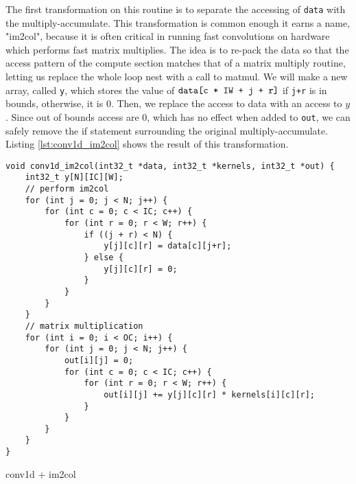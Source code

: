 \documentclass[acmsmall, nonacm=true]{acmart}
\begin{document}
The first transformation on this routine is to separate the accessing of \verb|data| with the multiply-accumulate. This transformation is common enough it earns a name, "im2col", because it is often critical in running fast convolutions on hardware which performs fast matrix multiplies. The idea is to re-pack the data so that the access pattern of the compute section matches that of a matrix multiply routine, letting us replace the whole loop nest with a call to matmul. We will make a new array, called \verb|y|, which stores the value of $\verb|data[c * IW + j + r]|$ if \verb|j+r| is in bounds, otherwise, it is 0. Then, we replace the access to data with an access to $y$. Since out of bounds access are $0$, which has no effect when added to \verb|out|, we can safely remove the if statement surrounding the original multiply-accumulate. Listing \ref{lst:conv1d_im2col} shows the result of this transformation.

\begin{listing}
    \centering
    \begin{verbatim}
void conv1d_im2col(int32_t *data, int32_t *kernels, int32_t *out) {
    int32_t y[N][IC][W];
    // perform im2col
    for (int j = 0; j < N; j++) {
        for (int c = 0; c < IC; c++) {
            for (int r = 0; r < W; r++) {
                if ((j + r) < N) {
                    y[j][c][r] = data[c][j+r];
                } else {
                    y[j][c][r] = 0;
                }                    
            }
        }
    }
    // matrix multiplication
    for (int i = 0; i < OC; i++) {
        for (int j = 0; j < N; j++) {
            out[i][j] = 0;
            for (int c = 0; c < IC; c++) {
                for (int r = 0; r < W; r++) {
                    out[i][j] += y[j][c][r] * kernels[i][c][r];
                }
            }
        }
    }
}
\end{verbatim}
    \caption{conv1d + im2col}
    \label{lst:conv1d_im2col}
\end{listing}
\end{document}
